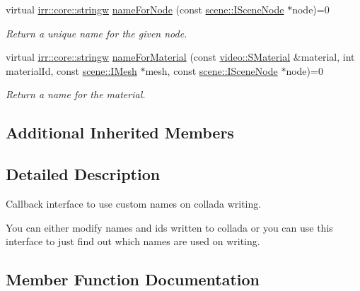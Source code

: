 \begin{DoxyCompactItemize}
virtual \hyperlink{namespaceirr_1_1core_a5aedb62cb47cf01d1c548ab5e6344d2d}{irr\+::core\+::stringw} \hyperlink{classirr_1_1scene_1_1IColladaMeshWriterNames_a60d3fdad90edc25b0305c91be15b255f}{name\+For\+Node} (const \hyperlink{classirr_1_1scene_1_1ISceneNode}{scene\+::\+I\+Scene\+Node} $\ast$node)=0
\begin{DoxyCompactList}\small\item\em Return a unique name for the given node. \end{DoxyCompactList}\item 
virtual \hyperlink{namespaceirr_1_1core_a5aedb62cb47cf01d1c548ab5e6344d2d}{irr\+::core\+::stringw} \hyperlink{classirr_1_1scene_1_1IColladaMeshWriterNames_acb5c8f38769d3fedcc76df73d9350c07}{name\+For\+Material} (const \hyperlink{classirr_1_1video_1_1SMaterial}{video\+::\+S\+Material} \&material, int material\+Id, const \hyperlink{classirr_1_1scene_1_1IMesh}{scene\+::\+I\+Mesh} $\ast$mesh, const \hyperlink{classirr_1_1scene_1_1ISceneNode}{scene\+::\+I\+Scene\+Node} $\ast$node)=0
\begin{DoxyCompactList}\small\item\em Return a name for the material. \end{DoxyCompactList}\end{DoxyCompactItemize}
\subsection*{Additional Inherited Members}


\subsection{Detailed Description}
Callback interface to use custom names on collada writing. 

You can either modify names and id\textquotesingle{}s written to collada or you can use this interface to just find out which names are used on writing. 

\subsection{Member Function Documentation}
\mbox{\label{classirr_1_1scene_1_1IColladaMeshWriterNames_acb5c8f38769d3fedcc76df73d9350c07}} 

